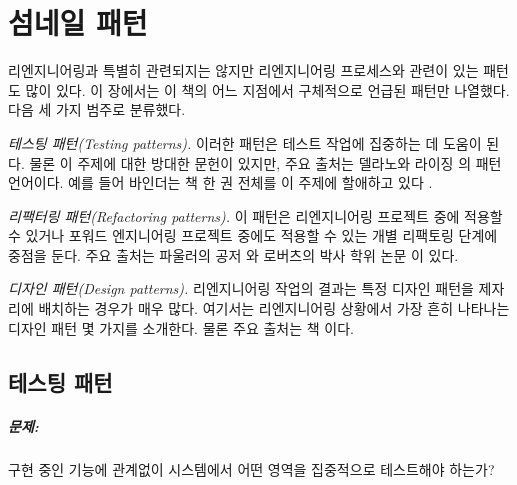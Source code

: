 \documentclass[a4paper,10pt,twoside]{book}
\begin{document}
	\appendix
	\renewcommand{\nnbb}[2]{} %
	\sloppy
\fi
\chapter{섬네일 패턴}


\label{pat:Adapter}
\label{pat:Facade}

리엔지니어링과 특별히 관련되지는 않지만 리엔지니어링 프로세스와 관련이 있는 패턴도 많이 있다. 이 장에서는 이 책의 어느 지점에서 구체적으로 언급된 패턴만 나열했다. 다음 세 가지 범주로 분류했다.

\begin{bulletlist}
\item \emph{테스팅 패턴(Testing patterns).}
이러한 패턴은 테스트 작업에 집중하는 데 도움이 된다. 물론 이 주제에 대한 방대한 문헌이 있지만, 주요 출처는 델라노와 라이징 \cite{DeLa98a}의 패턴 언어이다. 예를 들어 바인더는 책 한 권 전체를 이 주제에 할애하고 있다 \cite{Bind99a}.

\item \emph{리팩터링 패턴(Refactoring patterns).}
이 패턴은 리엔지니어링 프로젝트 중에 적용할 수 있거나 포워드 엔지니어링 프로젝트 중에도 적용할 수 있는 개별 리팩토링 단계에 중점을 둔다. 주요 출처는 파울러의 공저 \cite{Fowl99a}와 로버츠의 박사 학위 논문 \cite{Robe99a}이 있다.

\item \emph{디자인 패턴(Design patterns).}
리엔지니어링 작업의 결과는 특정 디자인 패턴을 제자리에 배치하는 경우가 매우 많다. 여기서는 리엔지니어링 상황에서 가장 흔히 나타나는 디자인 패턴 몇 가지를 소개한다. 물론 주요 출처는  책 \cite{Gamm95a}이다.
\end{bulletlist}

\section{테스팅 패턴}


\paragraph*{문제:}
구현 중인 기능에 관계없이 시스템에서 어떤 영역을 집중적으로 테스트해야 하는가?
\end{document}
